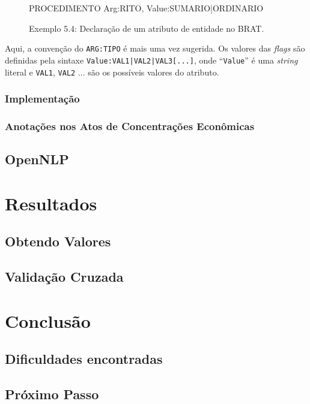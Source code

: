 \documentclass[11pt]{report}
\newcommand{\quotes}[1]{``#1''}
\begin{document}
\begin{figure}[h!]
\centering
\begin{boxedverbatim}
[attributes]

PROCEDIMENTO  Arg:RITO, Value:SUMARIO|ORDINARIO
\end{boxedverbatim}
\caption*{Exemplo 5.4: Declaração de um atributo de entidade no BRAT.}
\end{figure}

Aqui, a convenção do \texttt{ARG:TIPO} é mais uma vez sugerida. Os valores das \textit{flags} são definidas pela sintaxe \texttt{Value:VAL1|VAL2|VAL3[...]}, onde
\quotes{\texttt{Value}} é uma \textit{string} literal e \texttt{VAL1}, \texttt{VAL2} ... são os possíveis valores do atributo.

\subsection{Implementação}

\subsection{Anotações nos Atos de Concentrações Econômicas}

\section{OpenNLP}

\pagebreak
\chapter{Resultados}
\section{Obtendo Valores}
\section{Validação Cruzada}


\pagebreak
\chapter{Conclusão}
\section{Dificuldades encontradas}
\section{Próximo Passo}
\end{document}
